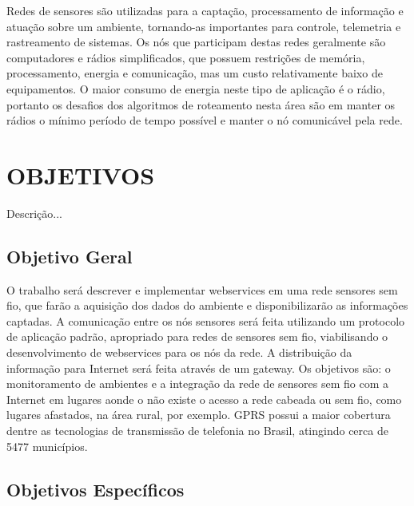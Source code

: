 Redes de sensores s\~ao utilizadas para a capta\c{c}\~ao, processamento de informa\c{c}\~ao e atua\c{c}\~ao sobre um ambiente, tornando-as importantes para controle, telemetria e rastreamento de sistemas.
Os n\'os que participam destas redes geralmente s\~ao computadores e r\'adios simplificados, que possuem restri\c{c}\~oes de mem\'oria, processamento, energia e comunica\c{c}\~ao, mas um custo relativamente baixo de equipamentos. O maior consumo de energia neste tipo de aplica\c{c}\~ao \'e o r\'adio, portanto os desafios dos algoritmos de roteamento nesta \'area s\~ao em manter os r\'adios o m\'inimo per\'iodo de tempo poss\'ivel e manter o n\'o comunic\'avel pela rede.

\section{OBJETIVOS}

Descri\c{c}\~ao...

\subsection{Objetivo Geral}

O trabalho ser\'a descrever e implementar webservices em uma rede sensores sem fio, que far\~ao a aquisi\c{c}\~ao dos dados do ambiente e disponibilizar\~ao as informa\c{c}\~oes captadas. A comunica\c{c}\~ao entre os n\'os sensores ser\'a feita utilizando um protocolo de aplica\c{c}\~ao padr\~ao, apropriado para redes de sensores sem fio, viabilisando o desenvolvimento de webservices para os n\'os da rede.
A distribui\c{c}\~ao da informa\c{c}\~ao para Internet ser\'a feita atrav\'es de um gateway. Os objetivos s\~ao: o monitoramento de ambientes e a integra\c{c}\~ao da rede de sensores sem fio com a Internet em lugares aonde o n\~ao existe o acesso a rede cabeada ou sem fio, como lugares afastados, na \'area rural, por exemplo. GPRS possui a maior cobertura dentre as tecnologias de transmiss\~ao de telefonia no Brasil, atingindo cerca de 5477 munic\'ipios.


\subsection{Objetivos Espec\'ificos}

